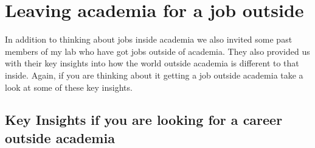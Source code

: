 \documentclass[
]{krantz}
\begin{document}
\hypertarget{leavingacademia}{%
\chapter{Leaving academia for a job outside}\label{leavingacademia}}

In addition to thinking about jobs inside academia we also invited some past members of my lab who have got jobs outside of academia. They also provided us with their key insights into how the world outside academia is different to that inside. Again, if you are thinking about it getting a job outside academia take a look at some of these key insights.

\hypertarget{key-insights-if-you-are-looking-for-a-career-outside-academia}{%
\section{Key Insights if you are looking for a career outside academia}\label{key-insights-if-you-are-looking-for-a-career-outside-academia}}
\end{document}
